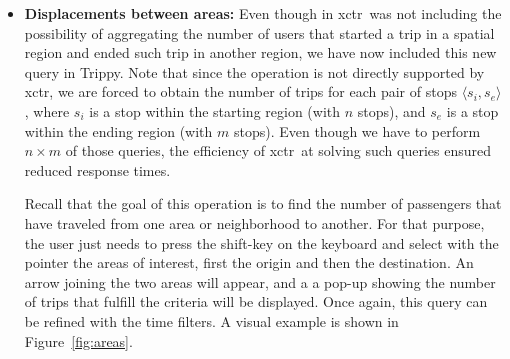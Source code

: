 \begin{itemize}
        
        \item \textbf{Displacements between areas:} Even though in \cite{daniil18} \gls{xctr}\ was not including the possibility of aggregating the number of users that started a trip in a spatial region and ended such trip in another region, we have now included this new query in Trippy.  Note that since the operation is not directly supported by \gls{xctr}, we are forced to obtain the number of trips for each pair of stops $\langle s_i,s_e\rangle$, where $s_i$ is a stop within the starting region (with $n$ stops), and $s_e$ is a stop within the ending region (with $m$ stops). Even though we have to perform $n \times m$ of those queries, the efficiency of \gls{xctr}\ at solving such queries ensured reduced response times.  %
        
        Recall that the goal of this operation is to find the number of passengers that have traveled from one area or neighborhood to another. For that purpose, the user just needs to press the  {\sc shift-key} on the keyboard and select with the pointer the areas of interest, first the origin and then the destination. An arrow joining the two areas will appear, and a a pop-up showing the number of trips that fulfill the criteria will be displayed. Once again, this query can be refined with the time filters. A visual example is shown in Figure~\ref{fig:areas}.
    \end{itemize}